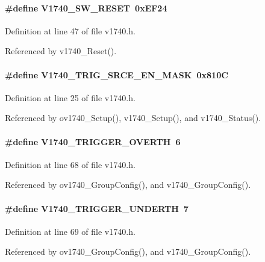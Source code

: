 \paragraph[{V1740\_\-SW\_\-RESET}]{\setlength{\rightskip}{0pt plus 5cm}\#define V1740\_\-SW\_\-RESET~0xEF24}\hfill\label{v1740_8h_a1acade46e99fb27ba5a8dddf4d70712b}


Definition at line 47 of file v1740.h.

Referenced by v1740\_\-Reset().
\paragraph[{V1740\_\-TRIG\_\-SRCE\_\-EN\_\-MASK}]{\setlength{\rightskip}{0pt plus 5cm}\#define V1740\_\-TRIG\_\-SRCE\_\-EN\_\-MASK~0x810C}\hfill\label{v1740_8h_a0498457de911a3b837115ef14f945e18}


Definition at line 25 of file v1740.h.

Referenced by ov1740\_\-Setup(), v1740\_\-Setup(), and v1740\_\-Status().
\paragraph[{V1740\_\-TRIGGER\_\-OVERTH}]{\setlength{\rightskip}{0pt plus 5cm}\#define V1740\_\-TRIGGER\_\-OVERTH~6}\hfill\label{v1740_8h_a0f0b0975aae48bba857b3b45565d4e0b}


Definition at line 68 of file v1740.h.

Referenced by ov1740\_\-GroupConfig(), and v1740\_\-GroupConfig().
\paragraph[{V1740\_\-TRIGGER\_\-UNDERTH}]{\setlength{\rightskip}{0pt plus 5cm}\#define V1740\_\-TRIGGER\_\-UNDERTH~7}\hfill\label{v1740_8h_a705b12e76a040615640560c216679ae2}


Definition at line 69 of file v1740.h.

Referenced by ov1740\_\-GroupConfig(), and v1740\_\-GroupConfig().
